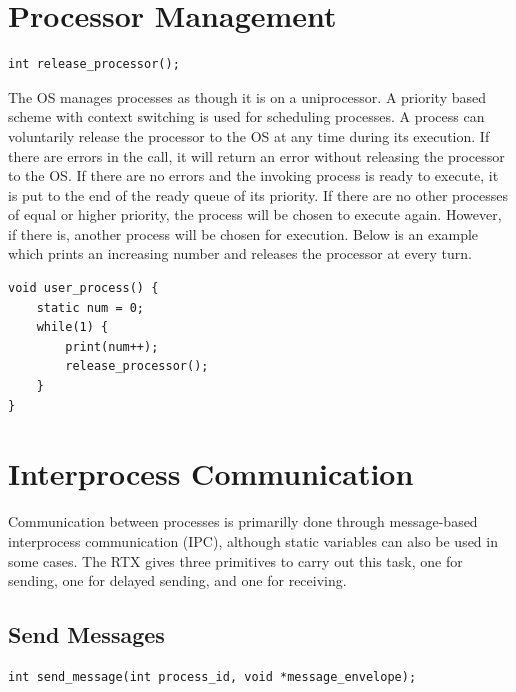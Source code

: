 \documentclass[12pt]{report}
\begin{document}
\bigskip

\section{Processor Management}
\begin{lstlisting}
int release_processor();
\end{lstlisting}

\par The OS manages processes as though it is on a uniprocessor. A priority based scheme with context switching is used for scheduling processes. A process can voluntarily release the processor to the OS at any time during its execution. If there are errors in the call, it will return an error without releasing the processor to the OS. If there are no errors and the invoking process is ready to execute, it is put to the end of the ready queue of its priority. If there are no other processes of equal or higher priority, the process will be chosen to execute again. However, if there is, another process will be chosen for execution. Below is an example which prints an increasing number and releases the processor at every turn.

\begin{lstlisting}
void user_process() {
    static num = 0;
    while(1) {
        print(num++);
        release_processor();
    }
}
\end{lstlisting}

\section{Interprocess Communication}
\par Communication between processes is primarilly done through message-based interprocess communication (IPC), although static variables can also be used in some cases. The RTX gives three primitives to carry out this task, one for sending, one for delayed sending, and one for receiving.

\subsection{Send Messages}
\label{sec:send_message}
\begin{lstlisting}
int send_message(int process_id, void *message_envelope);
\end{lstlisting}
\end{document}
